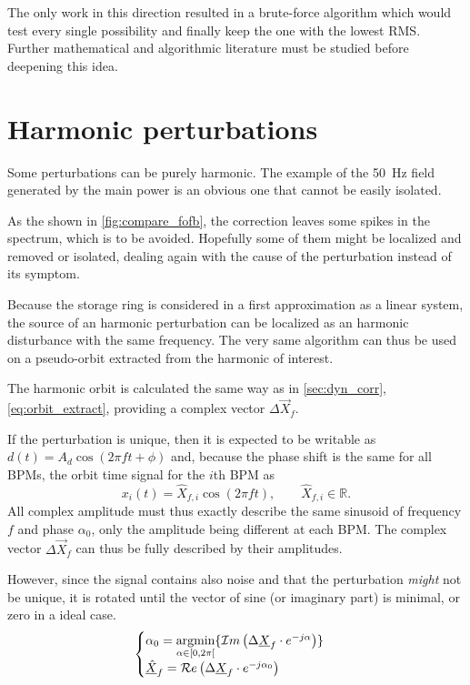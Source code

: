 The only work in this direction resulted in a brute-force algorithm which would test every single possibility and finally keep the one with the lowest RMS. Further mathematical and algorithmic literature must be studied before deepening this idea.

\section{Harmonic perturbations}
\label{sec:loc_dyn}
Some perturbations can be purely harmonic. The example of the \SI{50}{\hertz} field generated by the main power is an obvious one that cannot be easily isolated. 

As the shown in \cref{fig:compare_fofb}, the correction leaves some spikes in the spectrum, which is to be avoided. Hopefully some of them might be localized and removed or isolated, dealing again with the cause of the perturbation instead of its symptom.

Because the storage ring is considered in a first approximation as a linear system, the source of an harmonic perturbation can be localized as an harmonic disturbance with the same frequency. The very same algorithm can thus be used on a pseudo-orbit extracted from the harmonic of interest. 

The harmonic orbit is calculated the same way as in \cref{sec:dyn_corr}, \cref{eq:orbit_extract}, providing a complex vector $\Delta\vec{X}_f$.

If the perturbation is unique, then it is expected to be writable as $d(t) = A_d\cos(2\pi f t + \phi)$ and, because the phase shift is the same for all BPMs, the orbit time signal for the $i$th BPM as 
\begin{equation}
	x_i(t) = \hat{X}_{f,i} \cos (2\pi f t), \qquad \hat{X}_{f,i} \in \mathbb{R}.
\end{equation}
All complex amplitude must thus exactly describe the same sinusoid of frequency $f$ and phase $\alpha_0$, only the amplitude being different at each BPM.
The complex vector $\Delta\vec{X}_f$ can thus be fully described by their amplitudes.

However, since the signal contains also noise and that the perturbation \emph{might} not be unique, it is rotated until the vector of sine (or imaginary part) is minimal, or zero in a ideal case.
\begin{equation}
\begin{cases}\alpha_0 = \underset{\alpha \in [0, 2\pi[}{\textrm{argmin}}\{\mathcal{I}m\left(\Delta\underline{X}_f \cdot e^{-j\alpha}\right) \} \label{eq:harm_perturb_opt}\\
\underline{\hat{X}}_f = \mathcal{R}e\left(\Delta\underline{X}_f \cdot e^{-j\alpha_0}\right)
\end{cases}
\end{equation}

